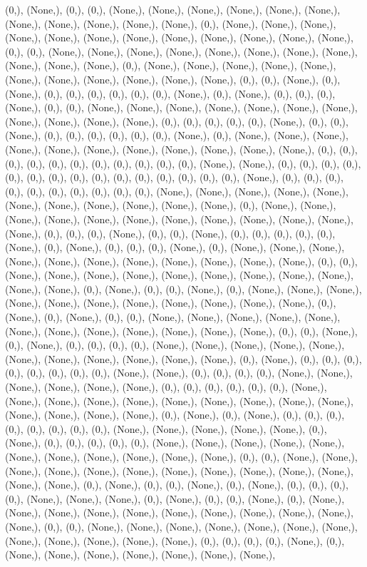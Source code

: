 \documentclass{article}
\begin{document}
(0,), (None,), (0,), (0,), (None,), (None,), (None,), (None,), (None,), (None,), (None,), (None,), (None,), (None,), (None,), (0,), (None,), (None,), (None,), (None,), (None,), (None,), (None,), (None,), (None,), (None,), (None,), (None,), (0,), (0,), (None,), (None,), (None,), (None,), (None,), (None,), (None,), (None,), (None,), (None,), (None,), (0,), (None,), (None,), (None,), (None,), (None,), (None,), (None,), (None,), (None,), (None,), (None,), (0,), (0,), (None,), (0,), (None,), (0,), (0,), (0,), (0,), (0,), (0,), (None,), (0,), (None,), (0,), (0,), (0,), (None,), (0,), (0,), (None,), (None,), (None,), (None,), (None,), (None,), (None,), (None,), (None,), (None,), (None,), (0,), (0,), (0,), (0,), (0,), (None,), (0,), (0,), (None,), (0,), (0,), (0,), (0,), (0,), (0,), (None,), (0,), (None,), (None,), (None,), (None,), (None,), (None,), (None,), (None,), (None,), (None,), (None,), (0,), (0,), (0,), (0,), (0,), (0,), (0,), (0,), (0,), (0,), (0,), (None,), (None,), (0,), (0,), (0,), (0,), (0,), (0,), (0,), (0,), (0,), (0,), (0,), (0,), (0,), (0,), (0,), (None,), (0,), (0,), (0,), (0,), (0,), (0,), (0,), (0,), (0,), (0,), (None,), (None,), (None,), (None,), (None,), (None,), (None,), (None,), (None,), (None,), (None,), (0,), (None,), (None,), (None,), (None,), (None,), (None,), (None,), (None,), (None,), (None,), (None,), (None,), (0,), (0,), (0,), (None,), (0,), (0,), (None,), (0,), (0,), (0,), (0,), (0,), (None,), (0,), (None,), (0,), (0,), (0,), (None,), (0,), (None,), (None,), (None,), (None,), (None,), (None,), (None,), (None,), (None,), (None,), (None,), (0,), (0,), (None,), (None,), (None,), (None,), (None,), (None,), (None,), (None,), (None,), (None,), (None,), (0,), (None,), (0,), (0,), (None,), (0,), (None,), (None,), (None,), (None,), (None,), (None,), (None,), (None,), (None,), (None,), (None,), (0,), (None,), (0,), (None,), (0,), (0,), (None,), (None,), (None,), (None,), (None,), (None,), (None,), (None,), (None,), (None,), (None,), (None,), (0,), (0,), (None,), (0,), (None,), (0,), (0,), (0,), (0,), (None,), (None,), (None,), (None,), (None,), (None,), (None,), (None,), (None,), (None,), (None,), (0,), (None,), (0,), (0,), (0,), (0,), (0,), (0,), (0,), (0,), (None,), (None,), (0,), (0,), (0,), (0,), (None,), (None,), (None,), (None,), (None,), (None,), (0,), (0,), (0,), (0,), (0,), (0,), (None,), (None,), (None,), (None,), (None,), (None,), (None,), (None,), (None,), (None,), (None,), (None,), (None,), (None,), (0,), (None,), (0,), (None,), (0,), (0,), (0,), (0,), (0,), (0,), (0,), (0,), (None,), (None,), (None,), (None,), (None,), (0,), (None,), (0,), (0,), (0,), (0,), (0,), (None,), (None,), (None,), (None,), (None,), (None,), (None,), (None,), (None,), (None,), (None,), (0,), (0,), (None,), (None,), (None,), (None,), (None,), (None,), (None,), (None,), (None,), (None,), (None,), (None,), (None,), (0,), (None,), (0,), (0,), (None,), (0,), (None,), (0,), (0,), (0,), (0,), (None,), (None,), (None,), (0,), (None,), (0,), (0,), (None,), (0,), (None,), (None,), (None,), (None,), (None,), (None,), (None,), (None,), (None,), (None,), (None,), (0,), (0,), (None,), (None,), (None,), (None,), (None,), (None,), (None,), (None,), (None,), (None,), (None,), (None,), (0,), (0,), (0,), (0,), (None,), (0,), (None,), (None,), (None,), (None,), (None,), (None,), (None,), 
\end{document}
